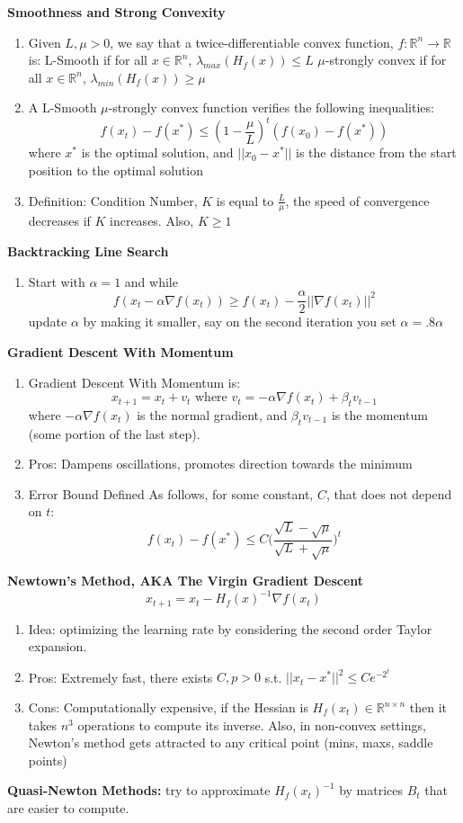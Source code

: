 \documentclass[12pt,twoside]{article}
\newcommand{\R}{\mathbb{R}}
\begin{document}
\textbf{Smoothness and Strong Convexity}
\begin{enumerate}
    \item Given $L,\mu>0$, we say that a twice-differentiable convex function, $f: \R^n \rightarrow \R$ is:
    \subitem L-Smooth if for all $x\in \R^n$, $\lambda_{max}(H_f(x)) \leq L$
    \subitem $\mu$-strongly convex if for all $x \in \R^n$, $\lambda_{min}(H_f(x)) \geq \mu$
    \item A L-Smooth $\mu$-strongly convex function verifies the following inequalities:
    $$
        f(x_t) - f(x^*) \leq (1- \frac{\mu}{L})^t(f(x_0)-f(x^*))
    $$
    where $x^*$ is the optimal solution, and $||x_0 - x^*||$ is the distance from the start position to the optimal solution
    \item Definition: Condition Number, $K$ is equal to $\frac{L}{\mu}$, the speed of convergence decreases if $K$ increases. Also, $K \geq 1$
\end{enumerate}
\textbf{Backtracking Line Search}
\begin{enumerate}
    \item Start with $\alpha = 1$ and while 
    $$
        f(x_t - \alpha \nabla f(x_t)) \geq f(x_t) - \frac{\alpha}{2}||\nabla f(x_t)||^2
    $$
    update $\alpha$ by making it smaller, say on the second iteration you set $\alpha = .8\alpha$
\end{enumerate}
\textbf{Gradient Descent With Momentum}
\begin{enumerate}
    \item Gradient Descent With Momentum is:
    $$
    x_{t+1} = x_t + v_t \text{ where } v_t = -\alpha \nabla f(x_t) + \beta_t v_{t-1}
    $$
    where $-\alpha \nabla f(x_t)$ is the normal gradient, and $\beta_t v_{t-1}$ is the momentum (some portion of the last step).
    \item Pros: Dampens oscillations, promotes direction towards the minimum
    \item Error Bound Defined As follows, for some constant, $C$, that does not depend on $t$:
    $$
        f(x_t) - f(x^*) \leq C \Bigg (\frac{\sqrt{L}-\sqrt{\mu}}{\sqrt{L}+\sqrt{\mu}}\Bigg )^t
    $$
\end{enumerate}
\textbf{Newtown's Method, AKA The Virgin Gradient Descent}
$$
    x_{t+1} = x_t - H_f(x)^{-1} \nabla f(x_t) 
$$
\begin{enumerate}
    \item Idea: optimizing the learning rate by considering the second order Taylor expansion. 
    \item Pros: Extremely fast, there exists $C, p > 0$ s.t. $||x_t - x^*||^2 \leq Ce^{-2^t}$
    \item Cons: Computationally expensive, if the Hessian is $H_f(x_t) \in \R^{n \times n}$ then it takes $n^3$ operations to compute its inverse. Also, in non-convex settings, Newton's method gets attracted to any critical point (mins, maxs, saddle points)
\end{enumerate}
\textbf{Quasi-Newton Methods:} try to approximate $H_f(x_t)^{-1}$ by matrices $B_t$ that are easier to compute.
\end{document}

